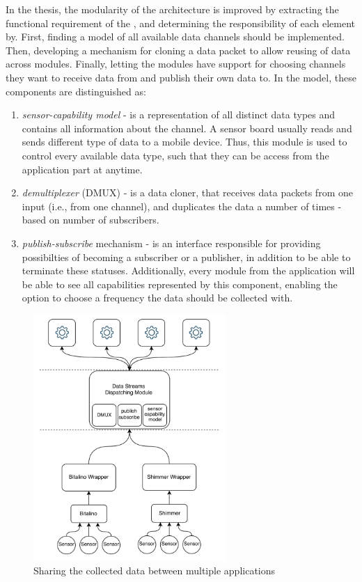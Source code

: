In the thesis, the modularity of the architecture is improved by extracting the functional requirement of the , and determining the responsibility of each element by. First, finding a model of all available data channels should be implemented. Then, developing a mechanism for cloning a data packet to allow reusing of data across modules. Finally, letting the modules have support for choosing channels they want to receive data from and publish their own data to. In the model, these components are distinguished as: 
\begin{enumerate}
    \item \textit{sensor-capability model} - is a representation of all distinct data types and contains all information about the channel. A sensor board usually reads and sends different type of data to a mobile device. Thus, this module is used to control every available data type, such that they can be access from the application part at anytime.
    \item \textit{demultiplexer} (DMUX) - is a data cloner, that receives data packets from one input (i.e., from one channel), and duplicates the data a number of times - based on number of subscribers.
    \item \textit{publish-subscribe} mechanism - is an interface responsible for providing  possibilties of becoming a subscriber or a publisher, in addition to be able to terminate these statuses. Additionally, every module from the application will be able to see all capabilities represented by this component, enabling the option to choose a frequency the data should be collected with.
\end{enumerate}

\begin{figure}
    \centering
    \includegraphics[width=0.65\textwidth]{images/demux.png}
    \caption{Sharing the collected data between multiple applications \cite{daniel}}
    \label{fig:demux}
\end{figure}

